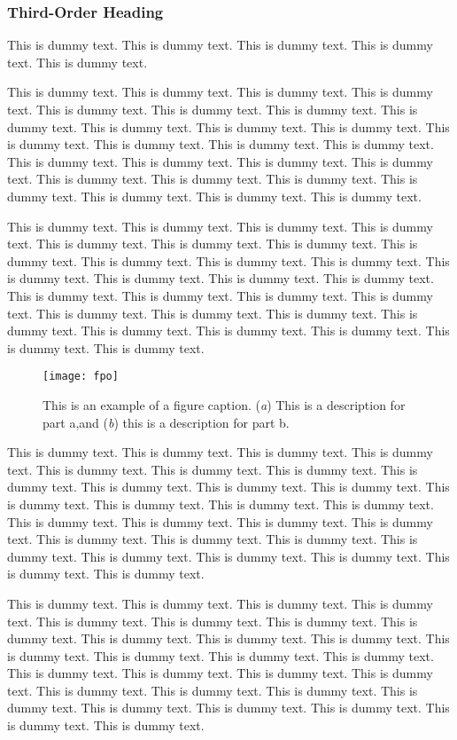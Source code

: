 \documentclass{aer}      %
\begin{document}
\subsubsection{Third-Order Heading}%
This is dummy text. This is dummy text. This is dummy text. This is dummy text. This is dummy text.

This is dummy text. This is dummy text. This is dummy text. This is dummy text. This is dummy text. This is dummy text. This is dummy text. This is dummy text. This is dummy text. This is dummy text. This is dummy text. This is dummy text. This is dummy text. This is dummy text. This is dummy text. This is dummy text. This is dummy text. This is dummy text. This is dummy text. This is dummy text. This is dummy text. This is dummy text. This is dummy text. This is dummy text. This is dummy text. This is dummy text.

This is dummy text. This is dummy text. This is dummy text. This is dummy text. This is dummy text. This is dummy text. This is dummy text. This is dummy text. This is dummy text. This is dummy text. This is dummy text. This is dummy text. This is dummy text. This is dummy text. This is dummy text. This is dummy text. This is dummy text. This is dummy text. This is dummy text. This is dummy text. This is dummy text. This is dummy text. This is dummy text. This is dummy text. This is dummy text. This is dummy text. This is dummy text. This is dummy text.

\begin{figure}[b]
\begin{center}
\texttt{[image: fpo]}%
\end{center}
\caption{This is an example of a figure caption. (\textit{a}) This is a description for part a,\break and (\textit{b}) this is a description for part b.}\label{fig1}
\end{figure}


This is dummy text. This is dummy text. This is dummy text. This is dummy text. This is dummy text. This is dummy text. This is dummy text. This is dummy text. This is dummy text. This is dummy text. This is dummy text. This is dummy text. This is dummy text. This is dummy text. This is dummy text. This is dummy text. This is dummy text. This is dummy text. This is dummy text. This is dummy text. This is dummy text. This is dummy text. This is dummy text. This is dummy text. This is dummy text. This is dummy text. This is dummy text. This is dummy text.

This is dummy text. This is dummy text. This is dummy text. This is dummy text. This is dummy text. This is dummy text. This is dummy text. This is dummy text. This is dummy text. This is dummy text. This is dummy text. This is dummy text. This is dummy text. This is dummy text. This is dummy text. This is dummy text. This is dummy text. This is dummy text. This is dummy text. This is dummy text. This is dummy text. This is dummy text. This is dummy text. This is dummy text. This is dummy text. This is dummy text. This is dummy text. This is dummy text.
\end{document}
